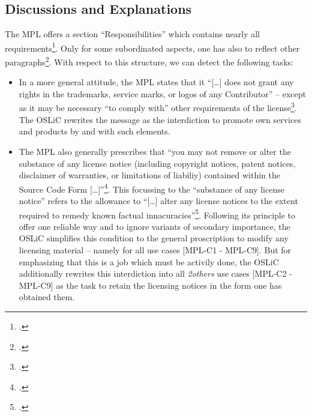 \subsection{Discussions and Explanations}

The MPL offers a section \enquote{Responsibilities} which contains nearly all
requirements\footcite[cf.][\nopage wp.\ §3]{Mpl20OsiLicense2013a}. Only for some
subordinated aspects, one has also to reflect other paragraphs\footcite[pars
pro to cf.][\nopage wp.\ §3 - concerning the trademarks]{Mpl20OsiLicense2013a}.
With respect to this structure, we can detect the following tasks:

\begin{itemize}

  \item In a more general attitude, the MPL states that it \enquote{[\ldots]
  does not grant any rights in the trademarks, service marks, or logos of any
  Contributor} -- except as it may be necessary \enquote{to comply with} other
  requirements of the license\footcite[cf.][\nopage wp.\
  §2.3]{Mpl20OsiLicense2013a}. The OSLiC rewrites the message as the
  interdiction to promote own services and products by and with such elements.
  
  \item The MPL also generally prescribes that \enquote{you may not remove or
  alter the substance of any license notice (including copyright notices, patent
  notices, disclaimer of warranties, or limitations of liabiliy) contained
  within the Source Code Form [\ldots]}\footcite[cf.][\nopage wp.\
  §3.4]{Mpl20OsiLicense2013a}. This focussing to the \enquote{substance of any
  license notice} refers to the allowance to \enquote{[\ldots] alter any license
  notices to the extent required to remedy known factual
  innacuracies}\footcite[cf.][\nopage wp.\ §3.4]{Mpl20OsiLicense2013a}.
  Following its principle to offer one reliable way and to ignore variants of
  secondary importance, the OSLiC simplifies this condition to the general
  proscription to modify any licensing material -- namely for all use cases
  [MPL-C1 - MPL-C9]. But for emphasizing that this is a job which must be activily
  done, the OSLiC additionally rewrites this interdiction into all
  \emph{2others} use cases [MPL-C2 - MPL-C9] as the task to retain the licensing
  notices in the form one has obtained them.
  

\end{itemize}
